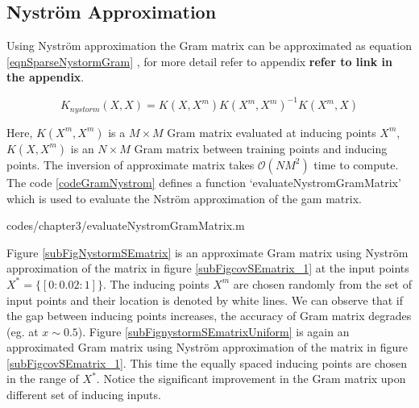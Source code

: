 \subsection{Nystr\"{o}m Approximation}\label{subSecNystrom} 

Using Nystr\"{o}m approximation the Gram matrix can be approximated as equation \ref{eqnSparseNystormGram} \cite{quinonero2005unifying, seeger2003fast}, for more detail refer to appendix \textbf{refer to link in the appendix}. 

\begin{equation}\label{eqnSparseNystormGram}
K_{nystorm}(X, X) = K(X, X^{m})K(X^{m}, X^{m})^{-1}K(X^{m}, X)
\end{equation}

Here, $K(X^{m}, X^{m})$ is a $M \times M$ Gram matrix evaluated at inducing points $X^{m}$, $K(X, X^{m})$ is an $N \times M$ Gram matrix between training points and inducing points. The inversion of approximate matrix takes $\mathcal{O}\left ( NM^{2} \right )$ time to compute. The code \ref{codeGramNystrom} defines a function `evaluateNystromGramMatrix' which is used to evaluate the Nstr\"{o}m approximation of the gam matrix. 

\begin{mdframed}[hidealllines=true,backgroundcolor=lightgray!20]

                    {codes/chapter3/evaluateNystromGramMatrix.m}
\end{mdframed}


Figure \ref{subFigNystormSEmatrix} is an approximate Gram matrix using Nystr\"{o}m approximation of the matrix in figure \ref{subFigcovSEmatrix_1} at the input points $X^{*} = \{[0:0.02:1]\}$. The inducing points $X^{m}$ are chosen randomly from the set of input points and their location is denoted by white lines. We can observe that if the gap between inducing points increases, the accuracy of Gram matrix degrades (eg. at $x \sim 0.5$). Figure \ref{subFignystormSEmatrixUniform} is again an approximated Gram matrix using Nystr\"{o}m approximation of the matrix in figure \ref{subFigcovSEmatrix_1}. This time the equally spaced inducing points are chosen in the range of $X^{*}$. Notice the significant improvement in the Gram matrix upon different set of inducing inputs.

